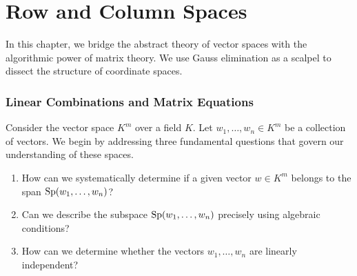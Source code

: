 \setcounter{chapter}{12} %
\renewcommand{\thetheorem}{\thechapter.\arabic{theorem}}
\setcounter{theorem}{0}

\chapter{Row and Column Spaces}

In this chapter, we bridge the abstract theory of vector spaces with the algorithmic power of matrix theory. We use Gauss elimination as a scalpel to dissect the structure of coordinate spaces.

\subsection{Linear Combinations and Matrix Equations}

Consider the vector space $K^{m}$ over a field $K$. Let $w_{1}, \dots, w_{n} \in K^{m}$ be a collection of vectors. We begin by addressing three fundamental questions that govern our understanding of these spaces.

\begin{question}
\label{q:foundational_questions}
\begin{enumerate}
    \item How can we systematically determine if a given vector $w \in K^{m}$ belongs to the span $\operatorname{Sp}(w_{1}, \dots, w_{n})$?
    \item Can we describe the subspace $\operatorname{Sp}(w_{1}, \dots, w_{n})$ precisely using algebraic conditions?
    \item How can we determine whether the vectors $w_{1}, \dots, w_{n}$ are linearly independent?
\end{enumerate}
\end{question}

